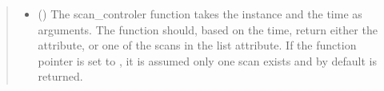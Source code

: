 \documentclass[letterpaper,10pt,english]{sphinxmanual}
\begin{document}
\begin{fulllineitems}
\begin{fulllineitems}
\begin{quote}
\begin{description}
\begin{itemize}
\item {} 
 () \textendash{} The scan\_controler function takes the {\hyperref[\detokenize{modules/antenna:antenna.AntennaTX}]{}} instance and the time as arguments. The function should, based on the time, return either the  attribute, or one of the scans in the list  attribute. If the function pointer is set to , it is assumed only one scan exists and by default  is returned.

\end{itemize}

\end{description}\end{quote}

\end{fulllineitems}


\end{fulllineitems}

\end{document}
